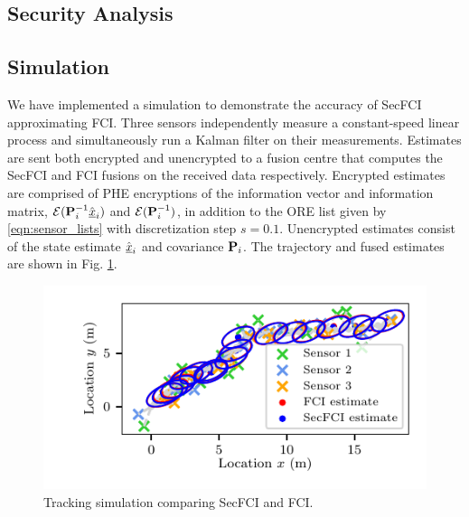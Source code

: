 % 
% 

\subsection{Security Analysis}

% 
% 

\subsection{Simulation} \label{sec:results}
We have implemented a simulation to demonstrate the accuracy of SecFCI approximating FCI. Three sensors independently measure a constant-speed linear process and simultaneously run a Kalman filter on their measurements. Estimates are sent both encrypted and unencrypted to a fusion centre that computes the SecFCI and FCI fusions on the received data respectively. Encrypted estimates are comprised of PHE encryptions of the information vector and information matrix, $\mathcal{E}({{\mathbf{P}}}^{-1}_i\hat{{\underline{x}}}_i)$ and $\mathcal{E}({{\mathbf{P}}}^{-1}_i)$, in addition to the ORE list given by \eqref{eqn:sensor_lists} with discretization step $s=0.1$. Unencrypted estimates consist of the state estimate $\hat{{\underline{x}}}_i$ and covariance ${{\mathbf{P}}}_i$. The trajectory and fused estimates are shown in Fig. \ref{fig:fci_secfci_traj}.
\begin{figure}[tb]
   \begin{center}
      \includegraphics{figures/fci_secfci_cmp.pdf}
   \end{center}
   \caption{Tracking simulation comparing SecFCI and FCI.}
   \label{fig:fci_secfci_traj}
\end{figure}

